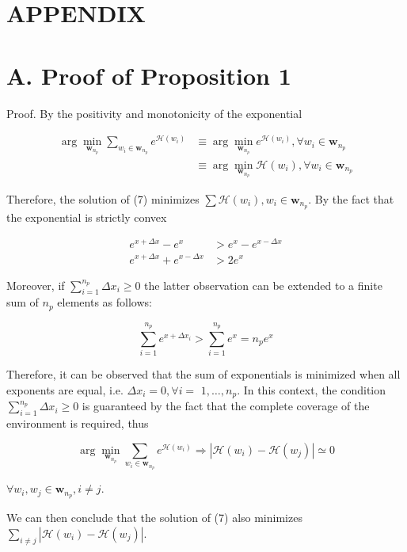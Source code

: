 \documentclass[conference]{IEEEtran}
\begin{document}
\section*{APPENDIX}
\section*{A. Proof of Proposition 1}
Proof. By the positivity and monotonicity of the exponential

$$
\begin{aligned}
\arg \min _{\mathbf{w}_{n_{p}}} \sum_{w_{i} \in \mathbf{w}_{n_{p}}} e^{\mathcal{H}\left(w_{i}\right)} & \equiv \arg \min _{\mathbf{w}_{n_{p}}} e^{\mathcal{H}\left(w_{i}\right)}, \forall w_{i} \in \mathbf{w}_{n_{p}} \\
& \equiv \arg \min _{\mathbf{w}_{n_{p}}} \mathcal{H}\left(w_{i}\right), \forall w_{i} \in \mathbf{w}_{n_{p}}
\end{aligned}
$$

Therefore, the solution of (7) minimizes $\sum \mathcal{H}\left(w_{i}\right), w_{i} \in \mathbf{w}_{n_{p}}$. By the fact that the exponential is strictly convex

$$
\begin{aligned}
e^{x+\Delta x}-e^{x} & >e^{x}-e^{x-\Delta x} \\
e^{x+\Delta x}+e^{x-\Delta x} & >2 e^{x}
\end{aligned}
$$

Moreover, if $\sum_{i=1}^{n_{p}} \Delta x_{i} \geq 0$ the latter observation can be extended to a finite sum of $n_{p}$ elements as follows:

$$
\sum_{i=1}^{n_{p}} e^{x+\Delta x_{i}}>\sum_{i=1}^{n_{p}} e^{x}=n_{p} e^{x}
$$

Therefore, it can be observed that the sum of exponentials is minimized when all exponents are equal, i.e. $\Delta x_{i}=0, \forall i=$ $1, \ldots, n_{p}$. In this context, the condition $\sum_{i=1}^{n_{p}} \Delta x_{i} \geq 0$ is guaranteed by the fact that the complete coverage of the environment is required, thus

$$
\arg \min _{\mathbf{w}_{n_{p}}} \sum_{w_{i} \in \mathbf{w}_{n_{p}}} e^{\mathcal{H}\left(w_{i}\right)} \Rightarrow\left|\mathcal{H}\left(w_{i}\right)-\mathcal{H}\left(w_{j}\right)\right| \simeq 0
$$

$\forall w_{i}, w_{j} \in \mathbf{w}_{n_{p}}, i \neq j$.

We can then conclude that the solution of (7) also minimizes $\sum_{i \neq j}\left|\mathcal{H}\left(w_{i}\right)-\mathcal{H}\left(w_{j}\right)\right|$.
\end{document}
